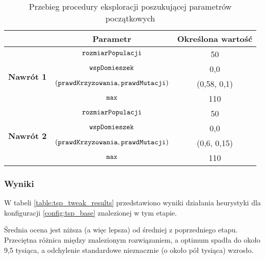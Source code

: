 \documentclass[./FM_mgr.tex]{subfiles}
\begin{document}
\begin{table}[H]
	\caption{Przebieg procedury eksploracji poszukującej parametrów początkowych \label{table:tsp_tweak_flow}}
	\centering
	\begin{tabular}{c|c|c|}
		\cline{2-3}
		& {\bf Parametr}                                     & {\bf Określona wartość} \\ \hline
		\multicolumn{1}{|c|}{\multirow{4}{*}{{\bf Nawrót 1}}} & $\mathtt{rozmiarPopulacji}$                         & 50                      \\ \cline{2-3} 
		\multicolumn{1}{|c|}{}                                & $\mathtt{wspDomieszek}$                             & 0,0                     \\ \cline{2-3} 
		\multicolumn{1}{|c|}{}                                & $(\mathtt{prawdKrzyzowania}, \mathtt{prawdMutacji})$ & (0,58, 0,1)             \\ \cline{2-3} 
		\multicolumn{1}{|c|}{}                                & $\mathtt{max}$                                      & 110                     \\ \hline \hline
		\multicolumn{1}{|c|}{\multirow{4}{*}{{\bf Nawrót 2}}} & $\mathtt{rozmiarPopulacji}$                         & 50                      \\ \cline{2-3} 
		\multicolumn{1}{|c|}{}                                & $\mathtt{wspDomieszek}$                             & 0,0                     \\ \cline{2-3} 
		\multicolumn{1}{|c|}{}                                & $(\mathtt{prawdKrzyzowania}, \mathtt{prawdMutacji})$ & (0,6, 0,15)             \\ \cline{2-3} 
		\multicolumn{1}{|c|}{}                                & $\mathtt{max}$                                      & 110                     \\ \hline
	\end{tabular}
\end{table}	

\subsubsection{Wyniki}

W tabeli \ref{table:tsp_tweak_results} przedstawiono wyniki działania heurystyki dla konfiguracji \ref{config:tsp_base} znalezionej w tym etapie.

Średnia ocena jest niższa (a więc lepsza) od średniej z poprzedniego etapu.
Przeciętna różnica między znalezionym rozwiązaniem, a optimum spadła do około 9,5 tysiąca, a odchylenie standardowe nieznacznie (o około pół tysiąca) wzrosło.
\end{document}
